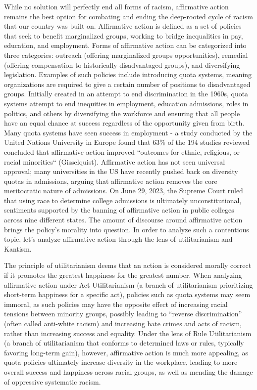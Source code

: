 While no solution will perfectly end all forms of racism, affirmative action remains the best option for combating and ending the deep-rooted cycle of racism that our country was built on. Affirmative action is defined as a set of policies that seek to benefit marginalized groups, working to bridge inequalities in pay, education, and employment. Forms of affirmative action can be categorized into three categories: outreach (offering marginalized groups opportunities), remedial (offering compensation to historically disadvantaged groups), and diversifying legislation. Examples of such policies include introducing quota systems, meaning organizations are required to give a certain number of positions to disadvantaged groups. Initially created in an attempt to end discrimination in the 1960s, quota systems attempt to end inequities in employment, education admissions, roles in politics, and others by diversifying the workforce and ensuring that all people have an equal chance at success regardless of the opportunity given from birth. Many quota systems have seen success in employment - a study conducted by the United Nations University in Europe found that 63\% of the 194 studies reviewed concluded that affirmative action improved “outcomes for ethnic, religious, or racial minorities“ (Gisselquist). Affirmative action has not seen universal approval; many universities in the US have recently pushed back on diversity quotas in admissions, arguing that affirmative action removes the core meritocratic nature of admissions. On June 29, 2023, the Supreme Court ruled that using race to determine college admissions is ultimately unconstitutional, sentiments supported by the banning of affirmative action in public colleges across nine different states. The amount of discourse around affirmative action brings the policy’s morality into question. In order to analyze such a contentious topic, let’s analyze affirmative action through the lens of utilitarianism and Kantism. 

The principle of utilitarianism deems that an action is considered morally correct if it promotes the greatest happiness for the greatest number. When analyzing affirmative action under Act Utilitarianism (a branch of utilitarianism prioritizing short-term happiness for a specific act), policies such as quota systems may seem immoral, as such policies may have the opposite effect of increasing racial tensions between minority groups, possibly leading to “reverse discrimination” (often called anti-white racism) and increasing hate crimes and acts of racism, rather than increasing success and equality. Under the lens of Rule Utilitarianism (a branch of utilitarianism that conforms to determined laws or rules, typically favoring long-term gain), however, affirmative action is much more appealing, as quota policies ultimately increase diversity in the workplace, leading to more overall success and happiness across racial groups, as well as mending the damage of oppressive systematic racism.

